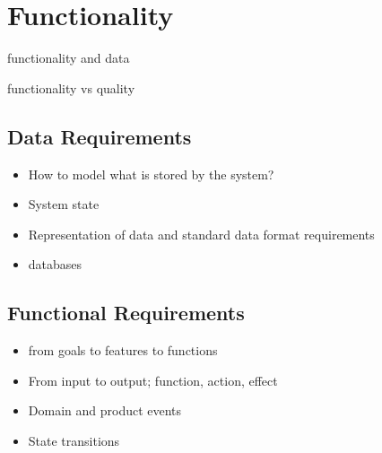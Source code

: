 
\chapter{Functionality}

functionality and data

functionality  vs quality


\section{Data Requirements}

\begin{itemize}
  \item How to model what is stored by the system?
  \item System state
  \item Representation of data and standard data format requirements
  \item databases
\end{itemize}



\section{Functional Requirements}

\begin{itemize}
  \item from goals to features to functions
  \item From input to output; function, action, effect
  \item Domain and product events
  \item State transitions
\end{itemize}
